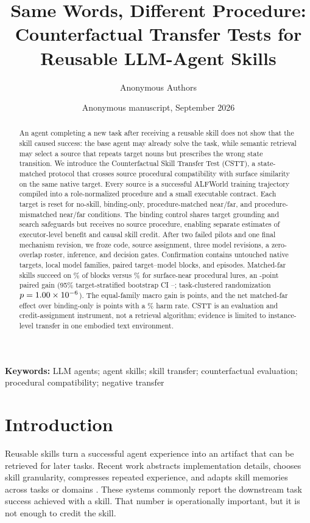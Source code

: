 \documentclass[10pt]{article}
\title{Same Words, Different Procedure: Counterfactual Transfer Tests for Reusable LLM-Agent Skills}
\author{Anonymous Authors}
\date{Anonymous manuscript, September 2026}
\begin{document}
\maketitle

\begin{abstract}
An agent completing a new task after receiving a reusable skill does not show
that the skill caused success: the base agent may already solve the task, while
semantic retrieval may select a source that repeats target nouns but prescribes
the wrong state transition. We introduce the Counterfactual Skill Transfer Test
(CSTT), a state-matched protocol that crosses source procedural compatibility
with surface similarity on the same native target. Every source is a successful
ALFWorld training trajectory compiled into a role-normalized procedure and a
small executable contract. Each target is reset for no-skill, binding-only,
procedure-matched near/far, and procedure-mismatched near/far conditions. The
binding control shares target grounding and search safeguards but receives no
source procedure, enabling separate estimates of executor-level benefit and
causal skill credit. After two failed pilots and one final mechanism revision,
we froze code, source assignment, three model revisions, a zero-overlap roster,
inference, and decision gates. Confirmation contains \TargetCount{} untouched
native targets, \ModelCount{} local model families, \BlockCount{} paired
target--model blocks, and \EpisodeCount{} episodes. Matched-far skills succeed
on \MatchedFarRate\% of blocks versus \LureNearRate\% for surface-near
procedural lures, an \PrimaryEffect-point paired gain (95\% target-stratified
bootstrap CI \PrimaryCILow--\PrimaryCIHigh; task-clustered randomization
$p=1.00\times 10^{-6}$). The equal-family macro gain is \MacroEffect{} points, and
the net matched-far effect over binding-only is \CausalNet{} points with a
\HarmRate\% harm rate. CSTT is an evaluation and credit-assignment instrument,
not a retrieval algorithm; evidence is limited to instance-level transfer in
one embodied text environment.
\end{abstract}

\noindent\textbf{Keywords:} LLM agents; agent skills; skill transfer;
counterfactual evaluation; procedural compatibility; negative transfer

\section{Introduction}
Reusable skills turn a successful agent experience into an artifact that can be
retrieved for later tasks. Recent work abstracts implementation details,
chooses skill granularity, compresses repeated experience, and adapts skill
memories across tasks or domains \citep{yu2026polyskill,feng2026breakdown,
xu2026compression,miao2026skilllens,he2026beyond}. These systems commonly report
the downstream task success achieved with a skill. That number is operationally
important, but it is not enough to credit the skill.
\end{document}
